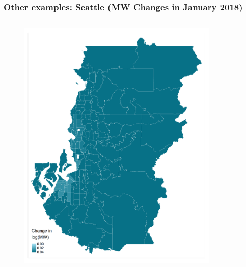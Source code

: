 \documentclass[aspectratio=169, t]{beamer}
\begin{document}
\begin{frame}[label = seattle_example]
\frametitle{Other examples: Seattle (MW Changes in January 2018)}
    \begin{columns}
        \begin{column}{0.50\textwidth}
            \vspace{-4mm}
            \begin{figure}
                \centering
                \includegraphics[scale = 0.36]{maps_events/output/seattle_2018-12_actual_mw.png}
            \end{figure}   
        \end{column}
        \begin{column}{0.50\textwidth}
            \vspace{-4mm}
            \begin{figure}
                \centering

\end{figure}
\end{column}
\end{columns}
\end{frame}
\end{document}

